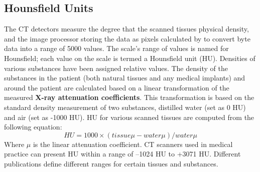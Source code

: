 \subsection{Hounsfield Units}
The CT detectors measure the degree that the scanned tissues physical density, and the image processor storing the data as pixels calculated by to convert byte data into a range of 5000 values. The scale's range of values is named for Hounsfield; each value on the scale is termed a Hounsfield unit (HU). Densities of various substances have been assigned relative values. The density of the substances in the patient (both natural tissues and any medical implants) and around the patient are calculated based on a linear transformation of the measured \textbf{X-ray attenuation coefficients}. This transformation is based on the standard density measurement of two substances, distilled water (set as 0 HU) and air (set as -1000 HU). HU for various scanned tissues are computed from the following equation: 
\begin{equation}
    HU = 1000 \times (tissue \mu - water \mu)/ water \mu 
\end{equation}
Where $\mu$ is the linear attenuation coefficient. CT scanners used in medical practice can present HU within a range of –1024 HU to +3071 HU. Different publications define different ranges for certain tissues and substances.



